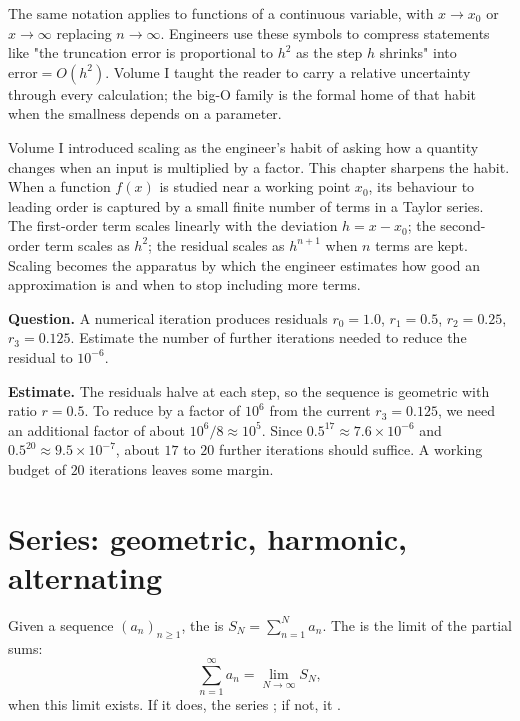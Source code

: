 The same notation applies to functions of a continuous variable, with
$x \to x_{0}$ or $x \to \infty$ replacing $n \to \infty$. Engineers use
these symbols to compress statements like "the truncation error is
proportional to $h^{2}$ as the step $h$ shrinks" into $\text{error} =
O(h^{2})$. Volume I taught the reader to carry a relative uncertainty
through every calculation; the big-O family is the formal home of that
habit when the smallness depends on a parameter.

\begin{archetype}
Volume I introduced scaling as the engineer's habit of asking how a
quantity changes when an input is multiplied by a factor. This chapter
sharpens the habit. When a function $f(x)$ is studied near a working
point $x_{0}$, its behaviour to leading order is captured by a small
finite number of terms in a Taylor series. The first-order term scales
linearly with the deviation $h = x - x_{0}$; the second-order term
scales as $h^{2}$; the residual scales as $h^{n+1}$ when $n$ terms are
kept. Scaling becomes the apparatus by which the engineer estimates
how good an approximation is and when to stop including more terms.
\end{archetype}

\begin{estimation}
\textbf{Question.} A numerical iteration produces residuals $r_{0} =
1.0$, $r_{1} = 0.5$, $r_{2} = 0.25$, $r_{3} = 0.125$. Estimate the
number of further iterations needed to reduce the residual to $10^{-6}$.

\textbf{Estimate.} The residuals halve at each step, so the sequence is
geometric with ratio $r = 0.5$. To reduce by a factor of $10^{6}$ from
the current $r_{3} = 0.125$, we need an additional factor of about
$10^{6} / 8 \approx 10^{5}$. Since $0.5^{17} \approx 7.6 \times 10^{-6}$
and $0.5^{20} \approx 9.5 \times 10^{-7}$, about $17$ to $20$ further
iterations should suffice. A working budget of $20$ iterations leaves
some margin.
\end{estimation}

\section{Series: geometric, harmonic, alternating}

Given a sequence $(a_{n})_{n \geq 1}$, the  is
$S_{N} = \sum_{n=1}^{N} a_{n}$. The  is the limit of
the partial sums:
\[
\sum_{n=1}^{\infty} a_{n} = \lim_{N \to \infty} S_{N},
\]
when this limit exists. If it does, the series ; if
not, it .

